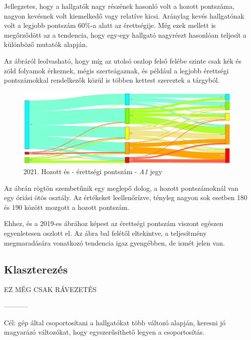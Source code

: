 \documentclass[12pt]{article}
\begin{document}
Jellegzetes, hogy a hallgatók nagy részének hasonló volt a hozott pontszáma, nagyon kevésnek volt kiemelkedő vagy relatíve kicsi. Aránylag kevés hallgatónak volt a legjobb pontszám 60\%-a alatt az érettségije. Még ezek mellett is megőrződött az a tendencia, hogy egy-egy hallgató nagyrészt hasonlóan teljesít a különböző mutatók alapján.

Az ábráról leolvasható, hogy míg az utolsó oszlop felső felébe szinte csak kék és zöld folyamok érkeznek, mégis szerteágaznak, és például a legjobb érettségi pontszámokkal rendelkezők közül is többen kettest szereztek a tárgyból. 

\begin{figure}[H]
\centering
\includegraphics[scale=0.6]{kepek/2021_hozott_erett_A1.png}
\caption{2021. Hozott és - érettségi pontszám - \textit{A1} jegy}
\label{fig:2021_hozott_erett_A1}
\end{figure}

Az ábrán rögtön szembetűnik egy meglepő dolog, a hozott pontszámoknál van egy óriási ötös osztály. Az értékeket leellenőrízve, tényleg nagyon sok esetben 180 és 190 között mozgott a hozott pontszám.

Ehhez, és a 2019-es ábrához képest az érettségi pontszám viszont egészen egyenletesen oszlott el. Az ábra bal felétől eltekintve, a teljesítmény megmaradására vonatkozó tendencia igaz gyengébben, de ismét jelen van.


\subsection{Klaszterezés}

EZ MÉG CSAK RÁVEZETÉS

-----------

Cél: gép által csoportosítani a hallgatókat több változó alapján, keresni jó magyarázó változókat, hogy egyszerűsíthető legyen a csoportosítás.
\end{document}
